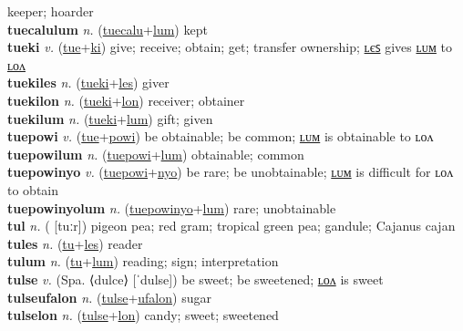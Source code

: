 keeper; hoarder \label{tuecalulon} \\
\textbf{tuecalulum} \textit{n.} (\hyperref[tuecalu]{tuecalu}+\hyperref[lum]{lum})
kept \label{tuecalulum} \\
\textbf{tueki} \textit{v.} (\hyperref[tue]{tue}+\hyperref[ki]{ki})
give; receive; obtain; get; transfer ownership; \hyperref[tuekiles]{ʟєꜱ} gives \hyperref[tuekilum]{ʟᴜᴍ} to \hyperref[tuekilon]{ʟᴏᴧ} \label{tueki} \\
\textbf{tuekiles} \textit{n.} (\hyperref[tueki]{tueki}+\hyperref[les]{les})
giver \label{tuekiles} \\
\textbf{tuekilon} \textit{n.} (\hyperref[tueki]{tueki}+\hyperref[lon]{lon})
receiver; obtainer \label{tuekilon} \\
\textbf{tuekilum} \textit{n.} (\hyperref[tueki]{tueki}+\hyperref[lum]{lum})
gift; given \label{tuekilum} \\
\textbf{tuepowi} \textit{v.} (\hyperref[tue]{tue}+\hyperref[powi]{powi})
be obtainable; be common; \hyperref[tuepowilum]{ʟᴜᴍ} is obtainable to ʟᴏᴧ \label{tuepowi} \\
\textbf{tuepowilum} \textit{n.} (\hyperref[tuepowi]{tuepowi}+\hyperref[lum]{lum})
obtainable; common \label{tuepowilum} \\
\textbf{tuepowinyo} \textit{v.} (\hyperref[tuepowi]{tuepowi}+\hyperref[nyo]{nyo})
be rare; be unobtainable; \hyperref[tuepowinyolum]{ʟᴜᴍ} is difficult for ʟᴏᴧ to obtain \label{tuepowinyo} \\
\textbf{tuepowinyolum} \textit{n.} (\hyperref[tuepowinyo]{tuepowinyo}+\hyperref[lum]{lum})
rare; unobtainable \label{tuepowinyolum} \\
\textbf{tul} \textit{n.} ( [tuːr])
pigeon pea; red gram; tropical green pea; gandule; Cajanus cajan \label{tul} \\
\textbf{tules} \textit{n.} (\hyperref[tu]{tu}+\hyperref[les]{les})
reader \label{tules} \\
\textbf{tulum} \textit{n.} (\hyperref[tu]{tu}+\hyperref[lum]{lum})
reading; sign; interpretation \label{tulum} \\
\textbf{tulse} \textit{v.} (Spa. ⟨dulce⟩ [ˈdulse])
be sweet; be sweetened; \hyperref[tulselon]{ʟᴏᴧ} is sweet \label{tulse} \\
\textbf{tulseufalon} \textit{n.} (\hyperref[tulse]{tulse}+\hyperref[ufalon]{ufalon})
sugar \label{tulseufalon} \\
\textbf{tulselon} \textit{n.} (\hyperref[tulse]{tulse}+\hyperref[lon]{lon})
candy; sweet; sweetened \label{tulselon} \\
